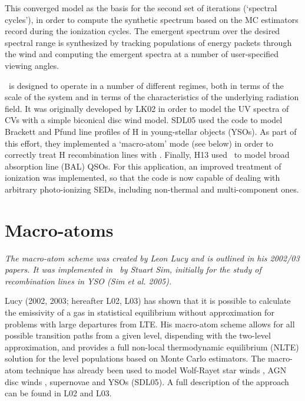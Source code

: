 This converged model as the basis for the second set of
iterations (`spectral cycles'), in order to compute the synthetic spectrum based on the 
MC estimators record during the ionization cycles. 
The emergent spectrum over the desired spectral range is synthesized by 
tracking populations of energy packets through the wind and computing the emergent spectra at
a number of user-specified viewing angles.  

\py\ is designed to operate in a number of different
regimes, both in terms of the scale of the system and in terms of the
characteristics of the underlying radiation field.
It was originally developed by LK02 in order to model the UV spectra
of CVs with a simple biconical disc wind model. SDL05
\nocite{simmacro2005} used the code to model Brackett
and Pfund line profiles of H in young-stellar objects (YSOs). As part
of this effort, they implemented a `macro-atom' mode (see below) in
order to correctly treat H recombination lines with
\py. Finally, H13 used \py\ to model broad absorption line (BAL) QSOs. For
this application, an improved treatment of ionization was implemented,
so that the code is now capable of dealing with arbitrary
photo-ionizing SEDs, including non-thermal and multi-component ones. 


\section{Macro-atoms}

{\sl The macro-atom scheme was created by Leon Lucy and is outlined in 
his 2002/03 papers. It was implemented in \py\ by Stuart Sim, initially
for the study of recombination lines in YSO (Sim et al. 2005).}

Lucy (2002, 2003\nocite{lucy2002, lucy2003}; hereafter L02, L03) 
has shown that it is possible to calculate the emissivity of a gas in
statistical equilibrium without approximation for problems with large departures
from LTE.
His macro-atom scheme allows for all possible transition paths from a given level,
dispending with the two-level approximation, and
provides a full non-local thermodynamic equilibrium (NLTE) solution
for the level populations based on Monte Carlo estimators. The macro-atom
technique has already been used to model Wolf-Rayet star
winds \citep{sim2004}, AGN disc winds \citep{simlong2008, tatum2012},
supernovae \citep{kromersim2009, kerzendorfsim} and YSOs (SDL05). A full 
description of the approach can be found in L02 and L03. 

